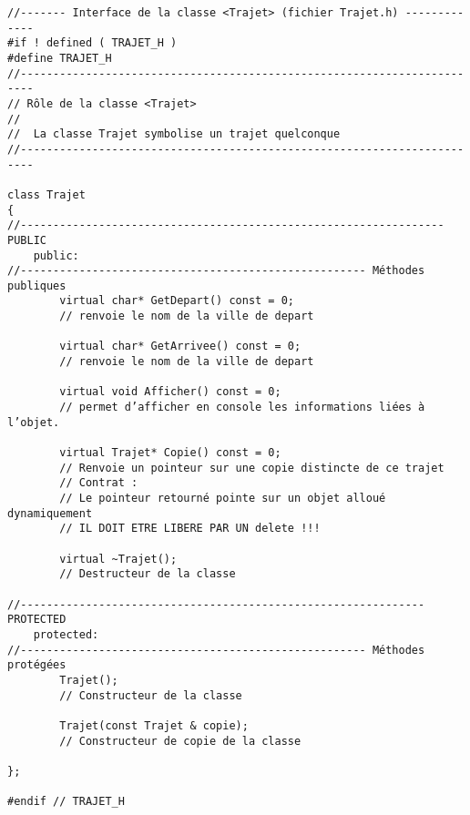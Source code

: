 \begin{verbatim}
//------- Interface de la classe <Trajet> (fichier Trajet.h) -------------
#if ! defined ( TRAJET_H )
#define TRAJET_H
//------------------------------------------------------------------------
// Rôle de la classe <Trajet>
//
//	La classe Trajet symbolise un trajet quelconque
//------------------------------------------------------------------------

class Trajet
{
//----------------------------------------------------------------- PUBLIC
    public:
//----------------------------------------------------- Méthodes publiques
        virtual char* GetDepart() const = 0;
        // renvoie le nom de la ville de depart
        
        virtual char* GetArrivee() const = 0;
        // renvoie le nom de la ville de depart
        
        virtual void Afficher() const = 0;
        // permet d’afficher en console les informations liées à l’objet.
        
        virtual Trajet* Copie() const = 0;
        // Renvoie un pointeur sur une copie distincte de ce trajet
        // Contrat :
        // Le pointeur retourné pointe sur un objet alloué dynamiquement
        // IL DOIT ETRE LIBERE PAR UN delete !!!
        
        virtual ~Trajet();
        // Destructeur de la classe

//-------------------------------------------------------------- PROTECTED
    protected:
//----------------------------------------------------- Méthodes protégées
        Trajet();
        // Constructeur de la classe
        
        Trajet(const Trajet & copie);
        // Constructeur de copie de la classe

};

#endif // TRAJET_H
\end{verbatim}
